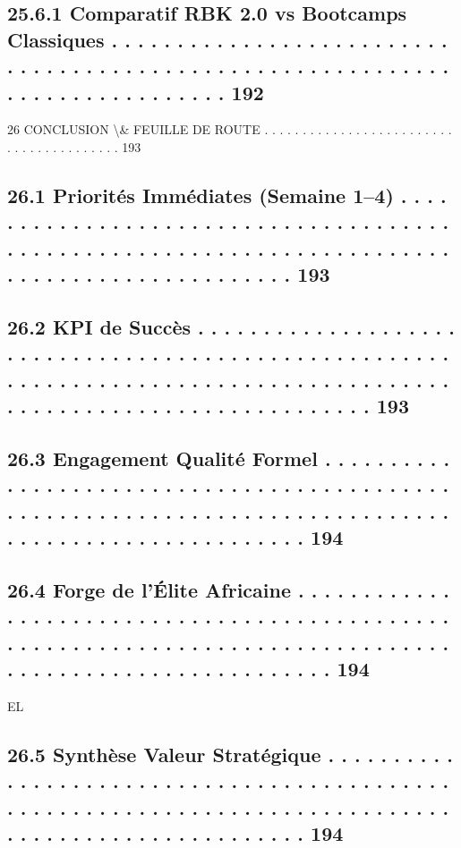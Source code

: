 \documentclass[12pt,landscape,a4paper]{article}
\begin{document}
\subsection{25.6.1              Comparatif RBK 2.0 vs Bootcamps Classiques . . . . . . . . . . . . . . . . . . . . . . . . . . . . . . . . . . . . . . . . . . . . . . . . . . . . . . . . . . . . . . . . . . . . . . . . . . . . . 192}
\vspace{0.5em}
26    CONCLUSION \textbackslash{}& FEUILLE DE ROUTE . . . . . . . . . . . . . . . . . . . . . . . . . . . . . . . . . . . . . . . . 193\\
\subsection{26.1    Priorités Immédiates (Semaine 1–4) . . . . . . . . . . . . . . . . . . . . . . . . . . . . . . . . . . . . . . . . . . . . . . . . . . . . . . . . . . . . . . . . . . . . . . . . . . . . . . . . . . . . . . . . . . . . . . 193}
\subsection{26.2    KPI de Succès . . . . . . . . . . . . . . . . . . . . . . . . . . . . . . . . . . . . . . . . . . . . . . . . . . . . . . . . . . . . . . . . . . . . . . . . . . . . . . . . . . . . . . . . . . . . . . . . . . . . . . . . . . . . . . . . . . . . 193}
\subsection{26.3    Engagement Qualité Formel . . . . . . . . . . . . . . . . . . . . . . . . . . . . . . . . . . . . . . . . . . . . . . . . . . . . . . . . . . . . . . . . . . . . . . . . . . . . . . . . . . . . . . . . . . . . . . . . . . . . . 194}
\subsection{26.4    Forge de l’Élite Africaine . . . . . . . . . . . . . . . . . . . . . . . . . . . . . . . . . . . . . . . . . . . . . . . . . . . . . . . . . . . . . . . . . . . . . . . . . . . . . . . . . . . . . . . . . . . . . . . . . . . . . . . . . 194}
\vspace{0.5em}
\vspace{0.5em}
\vspace{0.5em}
\vspace{0.5em}
EL\\
\subsection{26.5    Synthèse Valeur Stratégique . . . . . . . . . . . . . . . . . . . . . . . . . . . . . . . . . . . . . . . . . . . . . . . . . . . . . . . . . . . . . . . . . . . . . . . . . . . . . . . . . . . . . . . . . . . . . . . . . . . . . 194}
\end{document}
